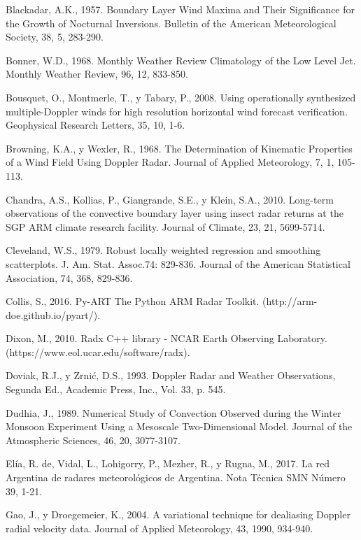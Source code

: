 \documentclass[12pt,spanish,oneside]{book}
\begin{document}
\hypertarget{ref-Blackadar1957}{}
Blackadar, A.K., 1957. Boundary Layer Wind Maxima and Their Significance
for the Growth of Nocturnal Inversions. Bulletin of the American
Meteorological Society, 38, 5, 283-290.

\hypertarget{ref-Bonner1968}{}
Bonner, W.D., 1968. Monthly Weather Review Climatology of the Low Level
Jet. Monthly Weather Review, 96, 12, 833-850.

\hypertarget{ref-Bousquet2008}{}
Bousquet, O., Montmerle, T., y Tabary, P., 2008. Using operationally
synthesized multiple-Doppler winds for high resolution horizontal wind
forecast verification. Geophysical Research Letters, 35, 10, 1-6.

\hypertarget{ref-Browning1968}{}
Browning, K.A., y Wexler, R., 1968. The Determination of Kinematic
Properties of a Wind Field Using Doppler Radar. Journal of Applied
Meteorology, 7, 1, 105-113.

\hypertarget{ref-Chandra2010}{}
Chandra, A.S., Kollias, P., Giangrande, S.E., y Klein, S.A., 2010.
Long-term observations of the convective boundary layer using insect
radar returns at the SGP ARM climate research facility. Journal of
Climate, 23, 21, 5699-5714.

\hypertarget{ref-Cleveland1979}{}
Cleveland, W.S., 1979. Robust locally weighted regression and smoothing
scatterplots. J. Am. Stat. Assoc.74: 829-836. Journal of the American
Statistical Association, 74, 368, 829-836.

\hypertarget{ref-Collis2016}{}
Collis, S., 2016. Py-ART The Python ARM Radar Toolkit.
(http://arm-doe.github.io/pyart/).

\hypertarget{ref-Dixon2010}{}
Dixon, M., 2010. Radx C++ library - NCAR Earth Observing Laboratory.
(https://www.eol.ucar.edu/software/radx).

\hypertarget{ref-Doviak1993}{}
Doviak, R.J., y Zrnić, D.S., 1993. Doppler Radar and Weather
Observations, Segunda Ed., Academic Press, Inc., Vol. 33, p. 545.

\hypertarget{ref-Dudhia1989}{}
Dudhia, J., 1989. Numerical Study of Convection Observed during the
Winter Monsoon Experiment Using a Mesoscale Two-Dimensional Model.
Journal of the Atmospheric Sciences, 46, 20, 3077-3107.

\hypertarget{ref-DeElia2017}{}
Elía, R. de, Vidal, L., Lohigorry, P., Mezher, R., y Rugna, M., 2017. La
red Argentina de radares meteorológicos de Argentina. Nota Técnica SMN
Número 39, 1-21.

\hypertarget{ref-Gao2004}{}
Gao, J., y Droegemeier, K., 2004. A variational technique for dealiasing
Doppler radial velocity data. Journal of Applied Meteorology, 43, 1990,
934-940.
\end{document}
